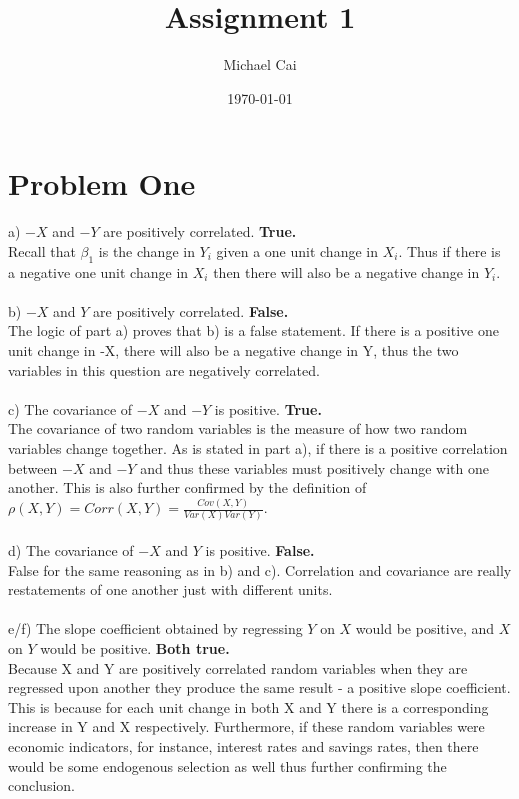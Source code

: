 \documentclass[11pt, oneside]{article}   	%
\title{Assignment 1}
\author{Michael Cai}
\date{\today}							%
\begin{document}
\maketitle
\section{Problem One}
a) $-X$ and $-Y$ are positively correlated. \textbf{True.}\\
Recall that $\beta_1$ is the change in $Y_i$ given a one unit change in $X_i$. Thus if there is a negative one unit change in $X_i$ then there will also be a negative change in $Y_i$. \\~\\
b) $-X$ and $Y$ are positively correlated. \textbf{False.}\\
The logic of part a) proves that b) is a false statement. If there is a positive one unit change in -X, there will also be a negative change in Y, thus the two variables in this question are negatively correlated.\\~\\
c) The covariance of $-X$ and $-Y$ is positive. \textbf{True.}\\
The covariance of two random variables is the measure of how two random variables change together. As is stated in part a), if there is a positive correlation between $-X$ and $-Y$ and thus these variables must positively change with one another. This is also further confirmed by the definition of $\rho(X,Y) = Corr(X,Y) = \frac{Cov(X,Y)}{Var(X)Var(Y)}$.\\~\\
d) The covariance of $-X$ and $Y$ is positive. \textbf{False.}\\
False for the same reasoning as in b) and c). Correlation and covariance are really restatements of one another just with different units.\\~\\
e/f) The slope coefficient obtained by regressing $Y$ on $X$ would be positive, and $X$ on $Y$ would be positive. \textbf{Both true.}\\
Because X and Y are positively correlated random variables when they are regressed upon another they produce the same result - a positive slope coefficient. This is because for each unit change in both X and Y there is a corresponding increase in Y and X respectively. Furthermore, if these random variables were economic indicators, for instance, interest rates and savings rates, then there would be some endogenous selection as well thus further confirming the conclusion.
\end{document}
